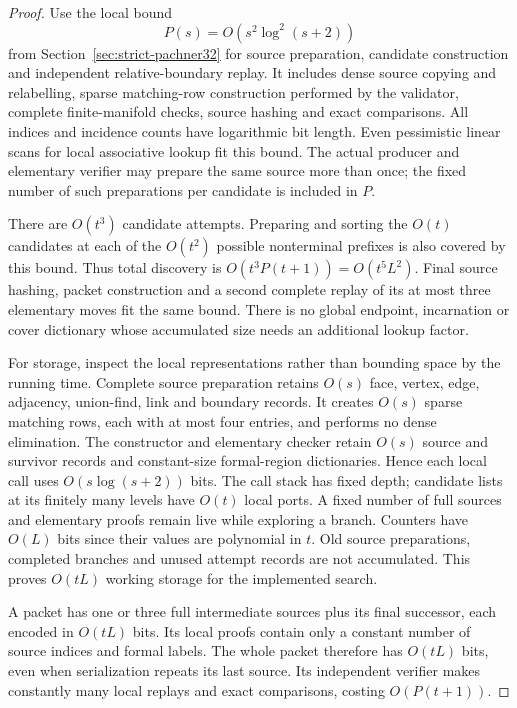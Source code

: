 \begin{proof}
Use the local bound
\[
                         P(s)=O(s^2\log^2(s+2))
\]
from Section~\ref{sec:strict-pachner32} for source preparation,
candidate construction and independent relative-boundary replay.
It includes dense source copying and relabelling, sparse matching-row
construction performed by the validator, complete finite-manifold
checks, source hashing and exact comparisons.  All indices and
incidence counts have logarithmic bit length.  Even pessimistic linear
scans for local associative lookup fit this bound.  The actual
producer and elementary verifier may prepare the same source more
than once; the fixed number of such preparations per candidate is
included in $P$.

There are $O(t^3)$ candidate attempts.  Preparing and sorting the
$O(t)$ candidates at each of the $O(t^2)$ possible nonterminal
prefixes is also covered by this bound.  Thus total discovery is
$O(t^3P(t+1))=O(t^5L^2)$.  Final source hashing, packet construction
and a second complete replay of its at most three elementary moves
fit the same bound.  There is no global endpoint, incarnation or
cover dictionary whose accumulated size needs an additional lookup
factor.

For storage, inspect the local representations rather than bounding
space by the running time.  Complete source preparation retains
$O(s)$ face, vertex, edge, adjacency, union-find, link and boundary
records.  It creates $O(s)$ sparse matching rows, each with at most
four entries, and performs no dense elimination.  The constructor and
elementary checker retain $O(s)$ source and survivor records and
constant-size formal-region dictionaries.  Hence each local call uses
$O(s\log(s+2))$ bits.  The call stack has fixed depth; candidate lists
at its finitely many levels have $O(t)$ local ports.  A fixed number
of full sources and elementary proofs remain live while exploring a
branch.  Counters have $O(L)$ bits since their values are polynomial
in $t$.  Old source preparations, completed branches and unused
attempt records are not accumulated.  This proves $O(tL)$ working
storage for the implemented search.

A packet has one or three full intermediate sources plus its final
successor, each encoded in $O(tL)$ bits.  Its local proofs contain
only a constant number of source indices and formal labels.  The
whole packet therefore has $O(tL)$ bits, even when serialization
repeats its last source.  Its independent verifier makes constantly
many local replays and exact comparisons, costing $O(P(t+1))$.
\end{proof}


